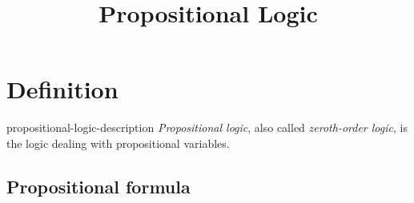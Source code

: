 \documentclass[preview]{standalone}
\begin{document}
\title{Propositional Logic}
\genpage

\section{Definition}

\begin{snippet}{propositional-logic-description}
\textit{Propositional logic}, also called \textit{zeroth-order logic},
is the logic dealing with propositional variables.
\end{snippet}


\subsection{Propositional formula}

\end{document}

